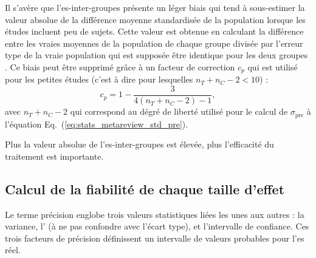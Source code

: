 Il s'avère que l'\gls{es}-inter-groupes présente un léger biais qui tend à sous-estimer la valeur absolue de la différence moyenne standardisée de la population
lorsque les études incluent peu de sujets. Cette valeur est obtenue en calculant la différence entre les vraies moyennes de la population de chaque groupe divisée 
par l'erreur type de la vraie population qui est supposée être identique pour les deux groupes \citep[Chapitre~4]{Borenstein2009}. Ce biais peut être supprimé 
grâce à un facteur de correction $c_p$ qui est utilisé pour les petites études (c'est à dire pour lesquelles $n_T + n_C - 2 < 10$) : 
\begin{equation}
\label{eq:metareview_correction_factor}
c_p =  1 - \frac{3} {4(n_T + n_C - 2) - 1},
\end{equation} 
avec $n_T + n_C - 2$ qui correspond au dégré de liberté utilisé pour le calcul de $\sigma_{\text{pre}}$ à l'équation Eq.~(\ref{eq:stats_metareview_std_pre}).

Plus la valeur absolue de l'\gls{es}-inter-groupes est élevée, plus l'efficacité du traitement est importante.

\subsection{Calcul de la fiabilité de chaque taille d'effet}

Le terme précision englobe trois valeurs statistiques liées les unes aux autres : la variance, l' (à ne pas confondre avec
l'écart type), et l'intervalle de confiance.
Ces trois facteurs de précision définissent un intervalle de valeurs probables pour l'\gls{es} réel. 

